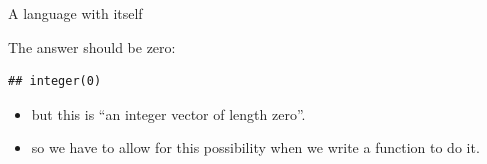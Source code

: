 \documentclass[
  ignorenonframetext,
]{beamer}
\newenvironment{Shaded}{\begin{snugshade}}{\end{snugshade}}
\newcommand{\DataTypeTok}[1]{\textcolor[rgb]{0.13,0.29,0.53}{#1}}
\newcommand{\KeywordTok}[1]{\textcolor[rgb]{0.13,0.29,0.53}{\textbf{#1}}}
\newcommand{\NormalTok}[1]{#1}
\newcommand{\OperatorTok}[1]{\textcolor[rgb]{0.81,0.36,0.00}{\textbf{#1}}}
\newcommand{\StringTok}[1]{\textcolor[rgb]{0.31,0.60,0.02}{#1}}
\providecommand{\tightlist}{%
  \setlength{\itemsep}{0pt}\setlength{\parskip}{0pt}}
\begin{document}
\begin{frame}[fragile]{A language with itself}
\protect\hypertarget{a-language-with-itself}{}

The answer should be zero:

\begin{Shaded}
\end{Shaded}

\begin{verbatim}
## integer(0)
\end{verbatim}

\begin{itemize}
\tightlist
\item
  but this is ``an integer vector of length zero''.
\item
  so we have to allow for this possibility when we write a function to
  do it.
\end{itemize}

\end{frame}
\end{document}
